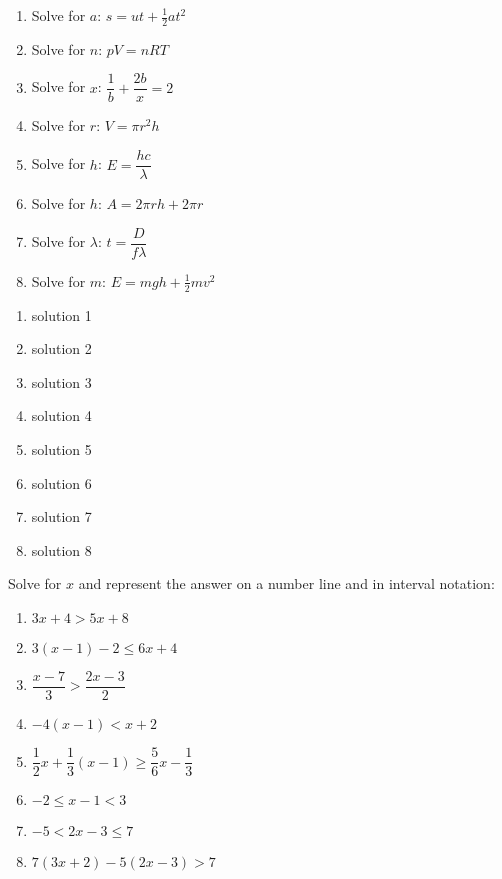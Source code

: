 \begin{exercises}{}
{
\begin{enumerate}[itemsep=5pt, label=\textbf{\arabic*}. ] 
\item Solve for $a$: $s=ut+\frac{1}{2}at^{2}$
\item Solve for $n$: $pV=nRT$ 
\item Solve for $x$: $\dfrac{1}{b}+\dfrac{2b}{x}=2$
\item Solve for $r$: $V = \pi r^{2} h$
\item Solve for $h$: $E=\dfrac{hc}{\lambda}$
\item Solve for $h$: $A=2\pi rh + 2 \pi r$
\item Solve for $\lambda$: $t=\dfrac{D}{f \lambda}$
\item Solve for $m$: $E=mgh + \frac{1}{2}mv^{2}$
\end{enumerate}

}
\end{exercises}


 \begin{solutions}{}{
\begin{enumerate}[itemsep=5pt, label=\textbf{\arabic*}. ] 


\item solution 1
\item solution 2
\item solution 3
\item solution 4
\item solution 5
\item solution 6
\item solution 7
\item solution 8

\end{enumerate}}
\end{solutions}



\begin{exercises}{ }
{
Solve for $x$ and represent the answer on a number line and in interval notation:
\begin{enumerate}[itemsep=6pt, label=\textbf{\arabic*}. ] 
    \item $3x+4>5x+8$
    \item $3(x-1)-2\leq 6x+4$ 
    \item $\dfrac{x-7}{3}>\dfrac{2x-3}{2}$
    \item $-4(x-1)<x+2$
    \item $\dfrac{1}{2}x+\dfrac{1}{3}(x-1)\geq \dfrac{5}{6}x-\dfrac{1}{3}$ 
    \item $-2\leq x-1<3$ 
    \item $-5<2x-3\leq7$ 
\item $7(3x+2)-5(2x-3)>7$
    \end{enumerate}

}
\end{exercises}


